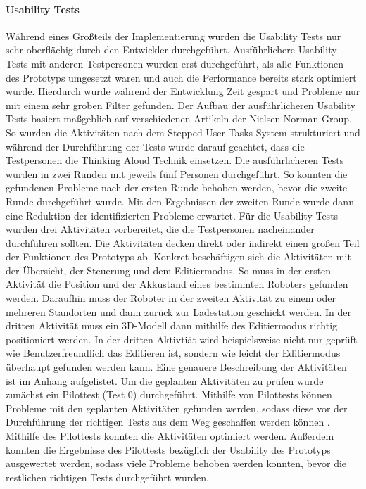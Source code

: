 \paragraph{Usability Tests}
Während eines Großteils der Implementierung wurden die Usability Tests nur sehr oberflächig durch den Entwickler durchgeführt. Ausführlichere Usability Tests mit anderen Testpersonen wurden erst durchgeführt, als alle Funktionen des Prototyps umgesetzt waren und auch die Performance bereits stark optimiert wurde. Hierdurch wurde während der Entwicklung Zeit gespart und Probleme nur mit einem sehr groben Filter gefunden. 
Der Aufbau der ausführlicheren Usability Tests basiert maßgeblich auf verschiedenen Artikeln der Nielsen Norman Group. So wurden die Aktivitäten nach dem Stepped User Tasks System \cite{Pernice.2020} strukturiert und während der Durchführung der Tests wurde darauf geachtet, dass die Testpersonen die Thinking Aloud Technik \cite{Nielsen.2012b} einsetzen.
Die ausführlicheren Tests wurden in zwei Runden mit jeweils fünf Personen durchgeführt. So konnten die gefundenen Probleme nach der ersten Runde behoben werden, bevor die zweite Runde durchgeführt wurde. Mit den Ergebnissen der zweiten Runde wurde dann eine Reduktion der identifizierten Probleme erwartet. Für die Usability Tests wurden drei Aktivitäten vorbereitet, die die Testpersonen nacheinander durchführen sollten. Die Aktivitäten decken direkt oder indirekt einen großen Teil der Funktionen des Prototyps ab. Konkret beschäftigen sich die Aktivitäten mit der Übersicht, der Steuerung und dem Editiermodus. So muss in der ersten Aktivität die Position und der Akkustand eines bestimmten Roboters gefunden werden. Daraufhin muss der Roboter in der zweiten Aktivität zu einem oder mehreren Standorten und dann zurück zur Ladestation geschickt werden. In der dritten Aktivität muss ein 3D-Modell dann mithilfe des Editiermodus richtig positioniert werden. In der dritten Aktivtiät wird beispielsweise nicht nur geprüft wie Benutzerfreundlich das Editieren ist, sondern wie leicht der Editiermodus überhaupt gefunden werden kann. Eine genauere Beschreibung der Aktivitäten ist im Anhang aufgelistet.
Um die geplanten Aktivitäten zu prüfen wurde zunächst ein Pilottest (Test 0) durchgeführt.
Mithilfe von Pilottests können Probleme mit den geplanten Aktivitäten gefunden werden, sodass diese vor der Durchführung der richtigen Tests aus dem Weg geschaffen werden können \cite{Schade.2015}.
Mithilfe des Pilottests konnten die Aktivitäten optimiert werden. Außerdem konnten die Ergebnisse des Pilottests bezüglich der Usability des Prototyps ausgewertet werden, sodass viele Probleme behoben werden konnten, bevor die restlichen richtigen Tests durchgeführt wurden.

